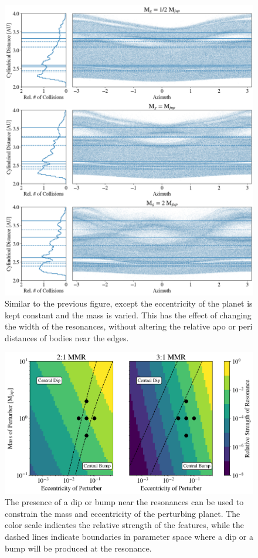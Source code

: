\documentclass[onecolumn]{aastex63}
\begin{document}
\begin{figure}
    \includegraphics[width=\textwidth]{figures/coll_polar_m.png}
    \caption{Similar to the previous figure, except the eccentricity of the planet is kept constant and the mass is varied.
    This has the effect of changing the width of the resonances, without altering the relative apo or peri distances of
    bodies near the edges.\label{fig:coll_polar_m}}
\end{figure}

\begin{figure}
\begin{center}
    \includegraphics[width=\textwidth]{figures/bump_dip_diag.png}
    \caption{The presence of a dip or bump near the resonances can be used to constrain the mass and eccentricity
    of the perturbing planet. The color scale indicates the relative strength of the features, while the dashed lines
    indicate boundaries in parameter space where a dip or a bump will be produced at the resonance.\label{fig:bump_dip_diag}}
\end{center}
\end{figure}
\end{document}
